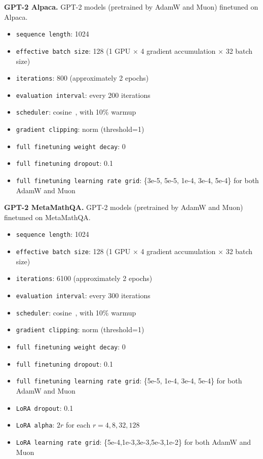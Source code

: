 \documentclass{article}
\theoremstyle{remark}
\begin{document}
\textbf{GPT-2 Alpaca.} GPT-2 models (pretrained by AdamW and Muon) finetuned on Alpaca.
\begin{itemize}
    \item \texttt{sequence length}: 1024
    \item \texttt{effective batch size}: 128 (1 GPU $\times$ 4 gradient accumulation $\times$ 32 batch size)
    \item \texttt{iterations}: 800 (approximately 2 epochs)
    \item \texttt{evaluation interval}: every 200 iterations
    \item \texttt{scheduler}: cosine~\citep{loshchilov2016sgdr}, with 10\% warmup
    \item \texttt{gradient clipping}: norm (threshold=1)
    \item \texttt{full finetuning weight decay}: 0
    \item \texttt{full finetuning dropout}: 0.1
    \item \texttt{full finetuning learning rate grid}: \{3e-5, 5e-5, 1e-4, 3e-4, 5e-4\} for both AdamW and Muon
\end{itemize}

\textbf{GPT-2 MetaMathQA.} GPT-2 models (pretrained by AdamW and Muon) finetuned on MetaMathQA.
\begin{itemize}
    \item \texttt{sequence length}: 1024
    \item \texttt{effective batch size}: 128 (1 GPU $\times$ 4 gradient accumulation $\times$ 32 batch size)
    \item \texttt{iterations}: 6100 (approximately 2 epochs)
    \item \texttt{evaluation interval}: every 300 iterations
    \item \texttt{scheduler}: cosine~\citep{loshchilov2016sgdr}, with 10\% warmup
    \item \texttt{gradient clipping}: norm (threshold=1)
    \item \texttt{full finetuning weight decay}: 0
    \item \texttt{full finetuning dropout}: 0.1
    \item \texttt{full finetuning learning rate grid}: \{5e-5, 1e-4, 3e-4, 5e-4\} for both AdamW and Muon
    \item \texttt{LoRA dropout}: 0.1
    \item \texttt{LoRA alpha}: $2r$ for each $r=4,8,32,128$
    \item \texttt{LoRA learning rate grid}: \{5e-4,1e-3,3e-3,5e-3,1e-2\} for both AdamW and Muon
\end{itemize}
\end{document}
